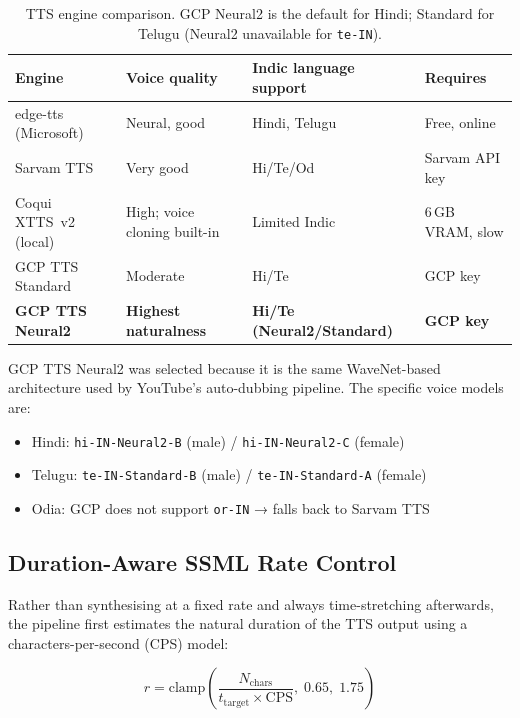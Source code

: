 \documentclass[12pt,a4paper]{article}
\begin{document}
\begin{table}[H]
\centering
\begin{tabularx}{\linewidth}{lXXX}
\toprule
\textbf{Engine} & \textbf{Voice quality} & \textbf{Indic language support} & \textbf{Requires} \\
\midrule
edge-tts (Microsoft)     & Neural, good  & Hindi, Telugu     & Free, online \\
Sarvam TTS               & Very good     & Hi/Te/Od          & Sarvam API key \\
Coqui XTTS~v2 (local)    & High; voice cloning built-in & Limited Indic & 6\,GB\,VRAM, slow \\
GCP TTS Standard         & Moderate      & Hi/Te             & GCP key \\
\textbf{GCP TTS Neural2} & \textbf{Highest naturalness} & \textbf{Hi/Te (Neural2/Standard)} & \textbf{GCP key} \\
\bottomrule
\end{tabularx}
\caption{TTS engine comparison.  GCP Neural2 is the default for Hindi; Standard for Telugu (Neural2 unavailable for \texttt{te-IN}).}
\end{table}

GCP TTS Neural2 was selected because it is the same WaveNet-based architecture
used by YouTube's auto-dubbing pipeline.  The specific voice models are:

\begin{itemize}
  \item Hindi: \texttt{hi-IN-Neural2-B} (male) / \texttt{hi-IN-Neural2-C} (female)
  \item Telugu: \texttt{te-IN-Standard-B} (male) / \texttt{te-IN-Standard-A} (female)
  \item Odia: GCP does not support \texttt{or-IN} → falls back to Sarvam TTS
\end{itemize}

\subsection{Duration-Aware SSML Rate Control}

Rather than synthesising at a fixed rate and always time-stretching afterwards,
the pipeline first estimates the natural duration of the TTS output using a
characters-per-second (CPS) model:

\begin{equation}
  r = \text{clamp}\!\left(\frac{N_\text{chars}}{t_\text{target} \times \text{CPS}},\; 0.65,\; 1.75\right)
\end{equation}
\end{document}
